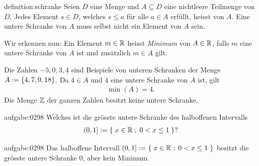 \begin{definition}{definition:schranke}
Seien $D$ eine Menge und $A\subseteq D$ eine nichtleere Teilmenge von $D$. Jedes Element $s\in D$, welches $s \leq a$ für alle $a\in A$ erfüllt, heisst  von $A$. Eine untere Schranke von $A$ muss selbst nicht ein Element von $A$ sein.   
\end{definition}
\noindent
Wir erkennen nun: Ein Element $m\in\mathbb{R}$ heisst \textit{Minimum} von $A\in\mathbb{R}$, falls $m$ eine untere Schranke von $A$ ist und zusätzlich $m\in A$ gilt.

\beispiele{-}{}
{Die Zahlen $-5, 0, 3, 4$ sind Beispiele von unteren Schranken der Menge $A:=\left\{4,7,9,18\right\}$. Da $4\in A$ und $4$ eine untere Schranke von $A$ ist, gilt
\begin{align*}
    \min(A) = 4.
\end{align*}
}
{Die Menge $\mathbb{Z}$ der ganzen Zahlen besitzt keine untere Schranke.}

\begin{aufgabe}{aufgabe:0298}
Welches ist die grösste untere Schranke des halboffenen Intervalls
    \begin{align*}
        \left(0, 1\right] := \left\{\;x\in\mathbb{R} \; ; \; 0<x\leq 1 \;\right\}?
    \end{align*}
\end{aufgabe}
\begin{antwort}{aufgabe:0298}
Das halboffene Intervall $\left(0, 1\right] := \left\{\;x\in\mathbb{R} \; ; \; 0<x\leq 1 \;\right\}$ besitzt die grösste untere Schranke $0$, aber kein Minimum.
\end{antwort}

